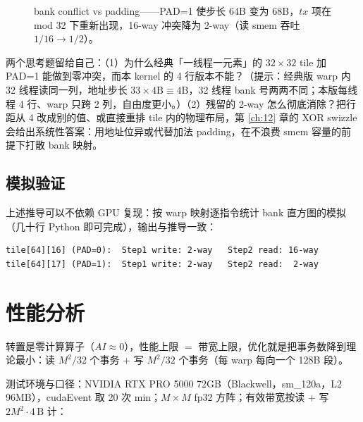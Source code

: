 \begin{figure}[htbp]
\caption{bank conflict vs padding——PAD=1 使步长 64B 变为 68B，$tx$ 项在 mod 32 下重新出现，16-way 冲突降为 2-way（读 smem 吞吐 $1/16 \to 1/2$）。}
\label{fig:7-1}
\end{figure}

两个思考题留给自己：（1）为什么经典「一线程一元素」的 $32 \times 32$ tile 加 PAD=1 能做到零冲突，而本 kernel 的 4 行版本不能？（提示：经典版 warp 内 32 线程读同一列，地址步长 $33 \times 4\mathrm{B} \equiv 4\mathrm{B}$，32 线程 bank 号两两不同；本版每线程 4 行、warp 只跨 2 列，自由度更小。）（2）残留的 2-way 怎么彻底消除？把行距从 4 改成别的值、或直接重排 tile 内的物理布局，第 \ref{ch:12} 章的 XOR swizzle 会给出系统性答案：用地址位异或代替加法 padding，在不浪费 smem 容量的前提下打散 bank 映射。

\subsection{模拟验证}

上述推导可以不依赖 GPU 复现：按 warp 映射逐指令统计 bank 直方图的模拟（几十行 Python 即可完成），输出与推导一致：

\begin{lstlisting}[style=console]
tile[64][16] (PAD=0):  Step1 write: 2-way   Step2 read: 16-way
tile[64][17] (PAD=1):  Step1 write: 2-way   Step2 read:  2-way
\end{lstlisting}

\section{性能分析}

转置是零计算算子（$AI \approx 0$），性能上限 $=$ 带宽上限，优化就是把事务数降到理论最小：读 $M^2/32$ 个事务 + 写 $M^2/32$ 个事务（每 warp 每向一个 128B 段）。

测试环境与口径：NVIDIA RTX PRO 5000 72GB（Blackwell，sm\_120a，L2 96MB），cudaEvent 取 20 次 min；$M \times M$ fp32 方阵；有效带宽按读 + 写 $2M^2 \cdot 4\,\mathrm{B}$ 计：

